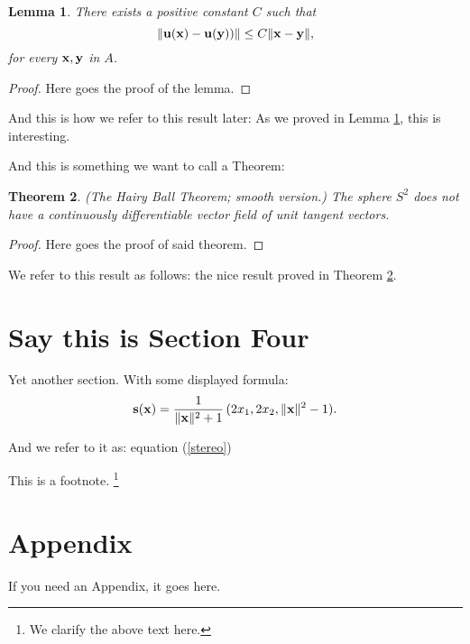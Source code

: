 \documentclass{amsart}
\newtheorem{theorem}{Theorem}[section]
\newtheorem{lemma}[theorem]{Lemma}
\theoremstyle{definition}
\numberwithin{equation}{section}
\def\ve#1{{\bf #1}}
\def\norm#1{\| {\bf #1} \|}
\def\norma#1{\| { #1} \|}
\begin{document}
\begin{sansmath}
\begin{lemma}
\label{lemma1}
    There exists a positive constant $C$ such that
    $$ \norma{\ve u(\ve x)  - \ve u  (\ve y))} \le C \norm{x-y} , $$
    for every $\ve x, \ve y$ in $A$.
\end{lemma}



\begin{proof}
Here goes the proof of the lemma.
\end{proof}

And this is how we refer to this result later:
As we proved in Lemma \ref{lemma1}, this is interesting.


\medskip

And this is something we want to call a Theorem:


\begin{theorem}
\label{hairy}
{\em(The Hairy Ball Theorem; smooth version.)}
    The sphere $S^2$ does not have a continuously differentiable vector field of unit tangent vectors.
\end{theorem}



\begin{proof}
  Here goes the proof of said theorem.
\end{proof}

We refer to this result as follows:
the nice result proved in Theorem \ref{hairy}.

\section{Say this is Section Four}

 Yet another section.
With some displayed formula:
    \begin{equation}
    \label{stereo}
       \ve s (\ve x) = {1 \over \norm{x}^2 + 1} \, (2 x_1, 2x_2, \norm{x}^2 - 1) .
    \end{equation}


  And we refer to it as: equation (\ref{stereo})

This is a footnote.
    \footnote{We clarify the above text here.}

    \medskip


\section{Appendix}

If you need an Appendix, it goes here.


\end{sansmath}
\end{document}
